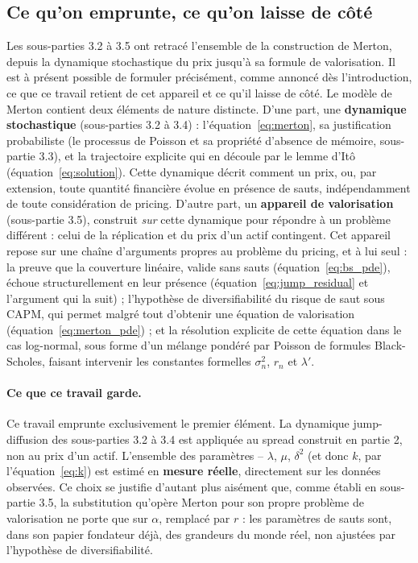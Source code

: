 \documentclass{article}
\begin{document}
\subsection{Ce qu'on emprunte, ce qu'on laisse de côté}
Les sous-parties 3.2 à 3.5 ont retracé l'ensemble de la construction de Merton, depuis la dynamique stochastique du prix jusqu'à sa formule de valorisation. Il est à présent possible de formuler précisément, comme annoncé dès l'introduction, ce que ce travail retient de cet appareil et ce qu'il laisse de côté.
Le modèle de Merton contient deux éléments de nature distincte. D'une part, une \textbf{dynamique stochastique} (sous-parties 3.2 à 3.4) : l'équation~\eqref{eq:merton}, sa justification probabiliste (le processus de Poisson et sa propriété d'absence de mémoire, sous-partie 3.3), et la trajectoire explicite qui en découle par le lemme d'Itô (équation~\eqref{eq:solution}). Cette dynamique décrit comment un prix, ou, par extension, toute quantité financière évolue en présence de sauts, indépendamment de toute considération de pricing.
D'autre part, un \textbf{appareil de valorisation} (sous-partie 3.5), construit \emph{sur} cette dynamique pour répondre à un problème différent : celui de la réplication et du prix d'un actif contingent. Cet appareil repose sur une chaîne d'arguments propres au problème du pricing, et à lui seul : la preuve que la couverture linéaire, valide sans sauts (équation~\eqref{eq:bs_pde}), échoue structurellement en leur présence (équation~\eqref{eq:jump_residual} et l'argument qui la suit) ; l'hypothèse de diversifiabilité du risque de saut sous CAPM, qui permet malgré tout d'obtenir une équation de valorisation (équation~\eqref{eq:merton_pde}) ; et la résolution explicite de cette équation dans le cas log-normal, sous forme d'un mélange pondéré par Poisson de formules Black-Scholes, faisant intervenir les constantes formelles $\sigma_n^2$, $r_n$ et $\lambda'$.
\paragraph{Ce que ce travail garde.} Ce travail emprunte exclusivement le premier élément. La dynamique jump-diffusion des sous-parties 3.2 à 3.4 est appliquée au spread construit en partie 2, non au prix d'un actif. L'ensemble des paramètres -- $\lambda$, $\mu$, $\delta^2$ (et donc $k$, par l'équation~\eqref{eq:k}) est estimé en \textbf{mesure réelle}, directement sur les données observées. Ce choix se justifie d'autant plus aisément que, comme établi en sous-partie 3.5, la substitution qu'opère Merton pour son propre problème de valorisation ne porte que sur $\alpha$, remplacé par $r$ : les paramètres de sauts sont, dans son papier fondateur déjà, des grandeurs du monde réel, non ajustées par l'hypothèse de diversifiabilité. 
\end{document}
